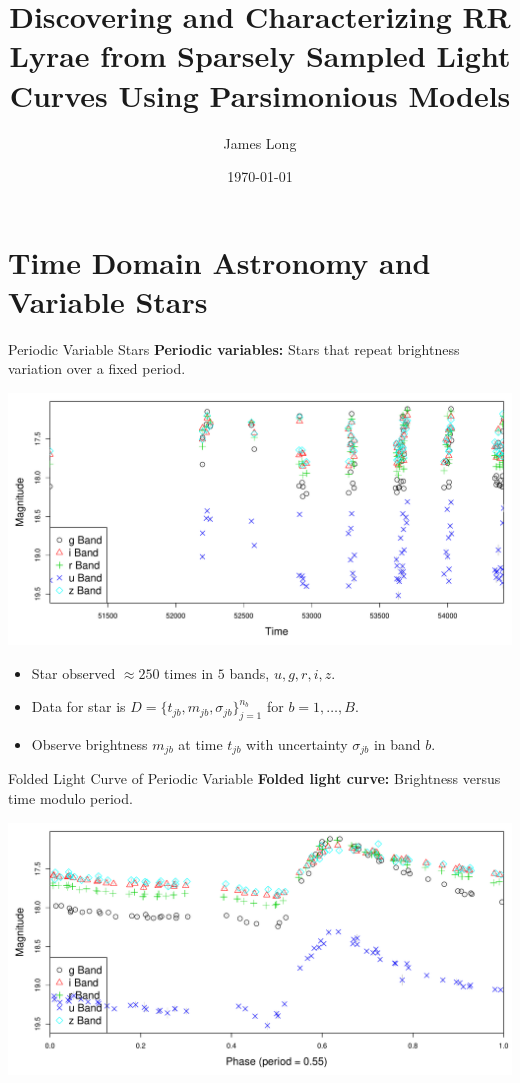 \documentclass[12pt]{beamer}
\title{Discovering and Characterizing RR Lyrae from Sparsely Sampled Light Curves Using Parsimonious Models}
\author{James Long}
\date{\today}
\begin{document}
\frame{\titlepage}

\frame{\tableofcontents}





\section{Time Domain Astronomy and Variable Stars}

\begin{frame}{Periodic Variable Stars}
\textbf{Periodic variables:} Stars that repeat brightness variation over a fixed period.
\begin{center}
\includegraphics[scale=.3]{figs/unfolded_13350.pdf}
\end{center}
\begin{itemize}
\item Star observed $\approx 250$ times in $5$ bands, $u,g,r,i,z$.
\item Data for star is $D=\{t_{jb},m_{jb},\sigma_{jb}\}_{j=1}^{n_b}$ for $b=1,\ldots,B$.
\item Observe brightness $m_{jb}$ at time $t_{jb}$ with uncertainty $\sigma_{jb}$ in band $b$.
\end{itemize}
\end{frame}


\begin{frame}{Folded Light Curve of Periodic Variable}
\textbf{Folded light curve:} Brightness versus time modulo period.
\begin{center}
\includegraphics[scale=.3]{figs/folded_13350.pdf}
\end{center}
\end{frame}
\end{document}
